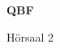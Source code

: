\documentclass[a4paper]{article}
\begin{document}
\printGenericVSLHeader
\begin{center}
\begin{vsltext}{3cm}{4cm}

   \vspace{0.5cm} 

    \textbf{QBF} 

    \vspace{1.5cm}

    Hörsaal 2

\end{vsltext}

\end{center}
\end{document}
